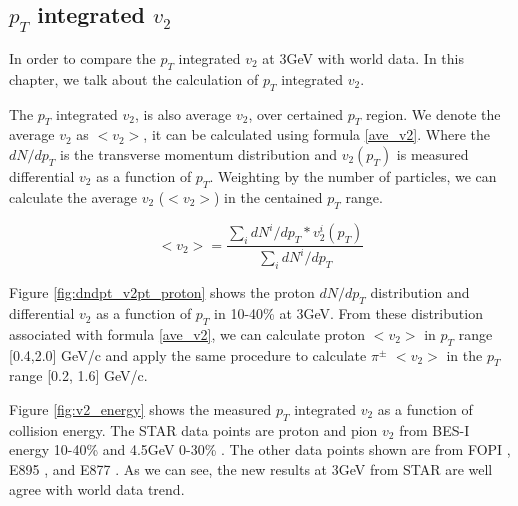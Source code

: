 \clearpage
\newpage

\subsection{$p_{T}$ integrated $v_{2}$}

In order to compare the $p_{T}$ integrated $v_{2}$ at 3GeV with world data. In this chapter, we talk about the calculation of $p_{T}$ integrated $v_{2}$.

The $p_{T}$ integrated $v_{2}$, is also average $v_{2}$, over certained $p_{T}$ region. We denote the average $v_{2}$ as $<v_{2}>$, it can be calculated using formula \ref{ave_v2}. Where the $dN/dp_{T}$ is the transverse momentum distribution and $v_{2}(p_{T})$ is measured differential $v_{2}$ as a function of $p_{T}$. Weighting by the number of particles, we can calculate the average $v_{2}$ ($<v_{2}>$) in the centained $p_{T}$ range.

\begin{equation}
    <v_{2}> = \frac{\sum_{i} dN^{i}/dp_{T}*v_{2}^{i}(p_{T})}{\sum_{i}dN^{i}/dp_{T}}
    \label{ave_v2}
\end{equation}

Figure \ref{fig:dndpt_v2pt_proton} shows the proton $dN/dp_{T}$ distribution and differential $v_{2}$ as a function of $p_{T}$ in 10-40\% at 3GeV. From these distribution associated with formula \ref{ave_v2}, we can calculate proton $<v_{2}>$ in $p_{T}$ range [0.4,2.0] GeV/c and apply the same procedure to calculate $\pi^{\pm}$ $<v_{2}>$ in the $p_{T}$ range [0.2, 1.6] GeV/c.

Figure \ref{fig:v2_energy} shows the measured $p_{T}$ integrated $v_{2}$ as a function of collision energy. The STAR data points are proton and pion $v_{2}$ from BES-I energy 10-40\% and 4.5GeV 0-30\% \cite{Adam:2020pla}. The other data points shown are from FOPI \cite{Andronic:2004cp}, E895 \cite{Pinkenburg:1999ya}, and E877 \cite{Voloshin:1997rs}. As we can see, the new results at 3GeV from STAR are well agree with world data trend.

